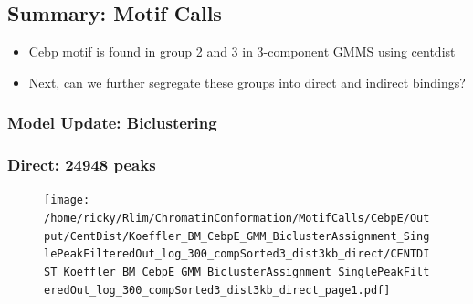 \documentclass[notes]{beamer}
\begin{document}
\subsection{Summary: Motif Calls}
\begin{frame}
    \begin{itemize}[<+->]
        \item Cebp motif is found in group 2 and 3 in 3-component GMMS using centdist
        \item Next, can we further segregate these groups into direct and indirect bindings?
    \end{itemize}
\end{frame} 

\subsubsection{Model Update: Biclustering}
{ %
    \begin{frame}[plain]
     \end{frame}
}

\begin{frame}[plain]
    \frametitle{Direct: 24948 peaks}
    \begin{figure}
        \texttt{[image: /home/ricky/Rlim/ChromatinConformation/MotifCalls/CebpE/Output/CentDist/Koeffler\_BM\_CebpE\_GMM\_BiclusterAssignment\_SinglePeakFilteredOut\_log\_300\_compSorted3\_dist3kb\_direct/CENTDIST\_Koeffler\_BM\_CebpE\_GMM\_BiclusterAssignment\_SinglePeakFilteredOut\_log\_300\_compSorted3\_dist3kb\_direct\_page1.pdf]}
    \end{figure}
\end{frame}
\end{document}
